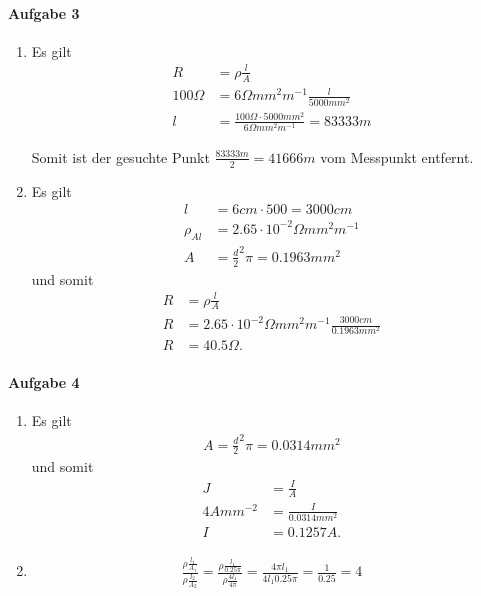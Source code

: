 \documentclass{article}
\begin{document}
\paragraph{Aufgabe 3}

\begin{enumerate}
    \item Es gilt
    \begin{align*}
        R &= \rho \frac{l}{A} \\
        100 \Omega &= 6 \Omega mm^2 m^{-1} \frac{l}{5000mm^2} \\
        l &= \frac{100 \Omega \cdot 5000 mm^2}{6 \Omega mm^2 m^{-1}} = 83333m
    \end{align*}

    Somit ist der gesuchte Punkt $\frac{83333m}{2} = 41666m$ vom Messpunkt entfernt.

    \item Es gilt
    \begin{align*}
        l &= 6cm \cdot 500 = 3000cm \\
        \rho_{Al} &= 2.65 \cdot 10^{-2} \Omega mm^2 m^{-1} \\
        A &= \frac{d}{2}^2 \pi = 0.1963mm^2
    \end{align*}
    und somit
    \begin{align*}
        R &= \rho \frac{l}{A} \\
        R &= 2.65 \cdot 10^{-2} \Omega mm^2 m^{-1} \frac{3000cm}{0.1963mm^2} \\
        R &= 40.5 \Omega.
    \end{align*}
\end{enumerate}

\paragraph{Aufgabe 4}

\begin{enumerate}
    \item Es gilt
    \begin{align*}
        A = \frac{d}{2}^2 \pi = 0.0314mm^2
    \end{align*}
    und somit
    \begin{align*}
        J &= \frac{I}{A} \\
        4 Amm^{-2} &= \frac{I}{0.0314mm^2} \\
        I &= 0.1257 A.
    \end{align*}

    \item
    \begin{align*}
        \frac{\rho \frac{l_1}{A_1}}{\rho \frac{l_2}{A_2}} = 
        \frac{\rho \frac{l_1}{0.25\pi}}{\rho \frac{4l_1}{4\pi}} =
        \frac{4 \pi l_1}{4 l_1 0.25 \pi} = \frac{1}{0.25} = 4
    \end{align*}
\end{enumerate}
\end{document}
